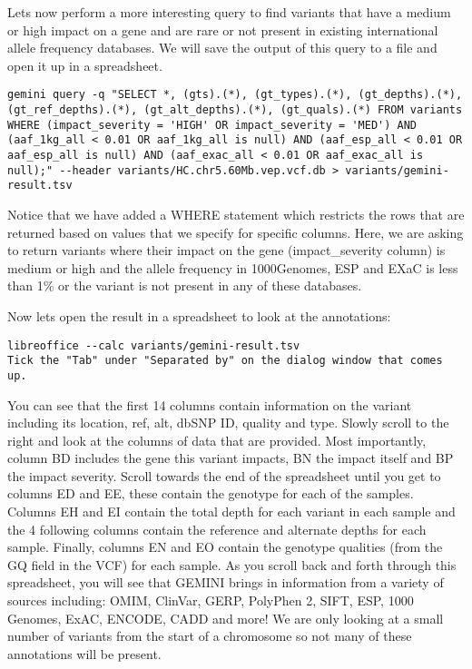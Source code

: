 Lets now perform a more interesting query to find variants that have a medium or high impact on a gene and are rare or not present in existing international allele frequency databases. We will save the output of this query to a file and open it up in a spreadsheet.

\begin{steps}
\begin{lstlisting}
gemini query -q "SELECT *, (gts).(*), (gt_types).(*), (gt_depths).(*), (gt_ref_depths).(*), (gt_alt_depths).(*), (gt_quals).(*) FROM variants WHERE (impact_severity = 'HIGH' OR impact_severity = 'MED') AND (aaf_1kg_all < 0.01 OR aaf_1kg_all is null) AND (aaf_esp_all < 0.01 OR aaf_esp_all is null) AND (aaf_exac_all < 0.01 OR aaf_exac_all is null);" --header variants/HC.chr5.60Mb.vep.vcf.db > variants/gemini-result.tsv
\end{lstlisting}
\end{steps}

Notice that we have added a WHERE statement which restricts the rows that are returned based on values that we specify for specific columns. Here, we are asking to return variants where their impact on the gene (impact\_severity column) is medium or high and the allele frequency in 1000Genomes, ESP and EXaC is less than 1\% or the variant is not present in any of these databases.

\begin{steps}
Now lets open the result in a spreadsheet to look at the annotations:
\begin{lstlisting}
libreoffice --calc variants/gemini-result.tsv
Tick the "Tab" under "Separated by" on the dialog window that comes up.
\end{lstlisting}
\end{steps}

You can see that the first 14 columns contain information on the variant including its location, ref, alt, dbSNP ID, quality and type. Slowly scroll to the right and look at the columns of data that are provided. Most importantly, column BD includes the gene this variant impacts, BN the impact itself and BP the impact severity. Scroll towards the end of the spreadsheet until you get to columns ED and EE, these contain the genotype for each of the samples. Columns EH and EI contain the total depth for each variant in each sample and the 4 following columns contain the reference and alternate depths for each sample. Finally, columns EN and EO contain the genotype qualities (from the GQ field in the VCF) for each sample. As you scroll back and forth through this spreadsheet, you will see that GEMINI brings in information from a variety of sources including: OMIM, ClinVar, GERP, PolyPhen 2, SIFT, ESP, 1000 Genomes, ExAC, ENCODE, CADD and more! We are only looking at a small number of variants from the start of a chromosome so not many of these annotations will be present.

